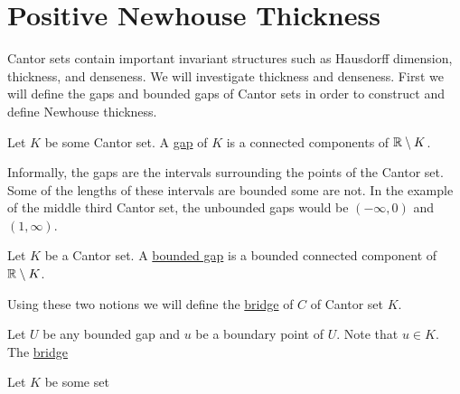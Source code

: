 \section{Positive Newhouse Thickness}
Cantor sets contain important invariant structures such as Hausdorff dimension, thickness, and denseness.  We will investigate thickness and denseness.  First we will define the gaps and bounded gaps of Cantor sets in order to construct and define Newhouse thickness. 
\begin{definition}[Gap]
    Let $K$ be some Cantor set.  A \underline{gap} of $K$ is a connected components of $\mathbb{R} \setminus K$.      
\end{definition}  Informally, the gaps are the intervals surrounding the points of the Cantor set.  Some of the lengths of these intervals are bounded some are not.  In the example of the middle third Cantor set, the unbounded gaps would be $(-\infty, 0)$ and $(1, \infty)$.  

\begin{definition}
    Let $K$ be a Cantor set.  A \underline{bounded gap} is a bounded connected component of $\mathbb{R} \setminus K$.      
\end{definition}

Using these two notions we will define the \underline{bridge} of $C$ of Cantor set $K$.  
\begin{definition}[bridge]\cite{palis&takens}
    Let $U$ be any bounded gap and $u$ be a boundary point of $U$.  Note that $u \in K$.  The \underline{bridge}    
\end{definition}

\begin{definition}\cite{palis&takens}
    Let $K$ be some set 
    
\end{definition}

